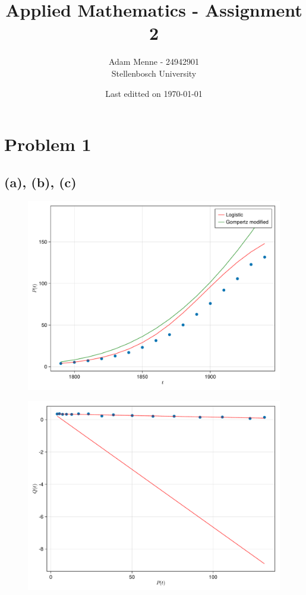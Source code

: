 \documentclass[a4paper, british]{article}
\title{Applied Mathematics - Assignment 2}
\date{Last editted on \today}
\author{Adam Menne - 24942901\\ Stellenbosch University}
\begin{document}
\maketitle

\vspace{40mm}

\tableofcontents

\newpage

\section{Problem 1}

\subsection*{(a), (b), (c)}

\begin{figure}[H]
    \centering
    \includegraphics[width=\textwidth]{figures/fig1.pdf}
    \caption{}
    \label{fig:1}
\end{figure}

\begin{figure}[H]
    \centering
    \includegraphics[width=\textwidth]{figures/fig2.pdf}
    \caption{}
    \label{fig:2}
\end{figure}
\end{document}
